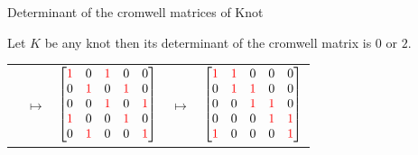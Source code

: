 \begin{frame}{Determinant of the cromwell matrices of Knot}
	\begin{thm}
		Let $K$ be any knot then its determinant of the cromwell matrix is $0$ or $2$.
	\end{thm}
	\mypf
	\begin{tabu}{X[5c]X[c]X[5c]X[c]X[5c]}
			 &
			$\longmapsto$ &
			$\begin{bmatrix}
				\textcolor{red}{1} & 0 & \textcolor{red}{1} & 0 & 0\\
				0 & \textcolor{red}{1} & 0 & \textcolor{red}{1} & 0\\
				0 & 0 & \textcolor{red}{1} & 0 & \textcolor{red}{1}\\
				\textcolor{red}{1} & 0 & 0 & \textcolor{red}{1} & 0\\
				0 & \textcolor{red}{1} & 0 & 0 & \textcolor{red}{1}
			\end{bmatrix}$&
			$\longmapsto$ &
			$\begin{bmatrix}
				\textcolor{red}{1} & \textcolor{red}{1} & 0 & 0 & 0\\
				0 & \textcolor{red}{1} & \textcolor{red}{1} & 0 & 0\\
				0 & 0 & \textcolor{red}{1} & \textcolor{red}{1} & 0\\
				0 & 0 & 0 & \textcolor{red}{1} & \textcolor{red}{1}\\
				\textcolor{red}{1} & 0 & 0 & 0 & \textcolor{red}{1}
			\end{bmatrix}$
	\end{tabu}
\end{frame}
